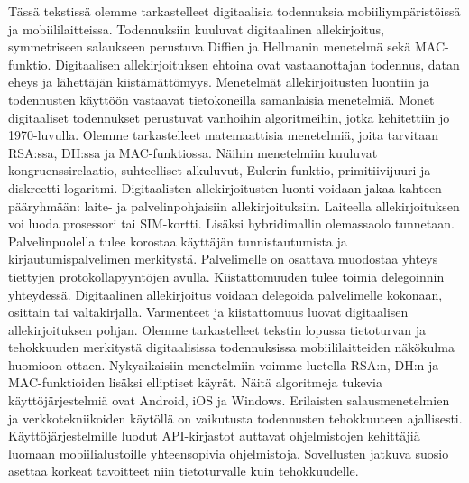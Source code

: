 \documentclass[finnish]{tktltiki2}
\theoremstyle{definition}
\theoremstyle{remark}
\begin{document}
Tässä tekstissä olemme tarkastelleet digitaalisia todennuksia mobiiliympäristöissä ja mobiililaitteissa. Todennuksiin kuuluvat digitaalinen allekirjoitus, symmetriseen salaukseen perustuva Diffien ja Hellmanin menetelmä sekä MAC-funktio. Digitaalisen allekirjoituksen ehtoina ovat vastaanottajan todennus, datan eheys ja lähettäjän kiistämättömyys. Menetelmät allekirjoitusten luontiin ja todennusten käyttöön vastaavat tietokoneilla samanlaisia menetelmiä. Monet digitaaliset todennukset perustuvat vanhoihin algoritmeihin, jotka kehitettiin jo 1970-luvulla. Olemme tarkastelleet matemaattisia menetelmiä, joita tarvitaan RSA:ssa, DH:ssa ja MAC-funktiossa. Näihin menetelmiin kuuluvat kongruenssirelaatio, suhteelliset alkuluvut, Eulerin funktio, primitiivijuuri ja diskreetti logaritmi. Digitaalisten allekirjoitusten luonti voidaan jakaa kahteen pääryhmään: laite- ja palvelinpohjaisiin allekirjoituksiin. Laiteella allekirjoituksen voi luoda prosessori tai SIM-kortti. Lisäksi hybridimallin olemassaolo tunnetaan. Palvelinpuolella tulee korostaa käyttäjän tunnistautumista ja kirjautumispalvelimen merkitystä. Palvelimelle on osattava muodostaa yhteys tiettyjen protokollapyyntöjen avulla. Kiistattomuuden tulee toimia delegoinnin yhteydessä. Digitaalinen allekirjoitus voidaan delegoida palvelimelle kokonaan, osittain tai valtakirjalla. Varmenteet ja kiistattomuus luovat digitaalisen allekirjoituksen pohjan. Olemme tarkastelleet tekstin lopussa tietoturvan ja tehokkuuden merkitystä digitaalisissa todennuksissa mobiililaitteiden näkökulma huomioon ottaen. Nykyaikaisiin menetelmiin voimme luetella RSA:n, DH:n ja MAC-funktioiden lisäksi elliptiset käyrät. Näitä algoritmeja tukevia käyttöjärjestelmiä ovat Android, iOS ja Windows. Erilaisten salausmenetelmien ja verkkotekniikoiden käytöllä on vaikutusta todennusten tehokkuuteen ajallisesti. Käyttöjärjestelmille luodut API-kirjastot auttavat ohjelmistojen kehittäjiä luomaan mobiilialustoille yhteensopivia ohjelmistoja. Sovellusten jatkuva suosio asettaa korkeat tavoitteet niin tietoturvalle kuin tehokkuudelle.

%
%
%

\newpage






 
\end{document}

